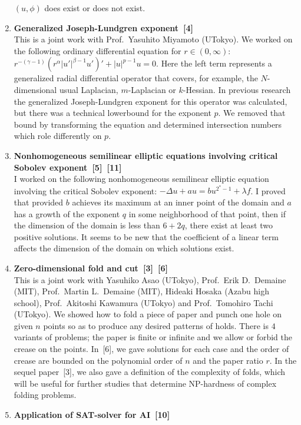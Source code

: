 \begin{enumerate}
  $(u, \phi)$ does exist or does not exist.
  \item {\bf Generalized Joseph-Lundgren exponent~[4]} \\
  This is a joint work with Prof.~Yasuhito Miyamoto (UTokyo).
  We worked on the following ordinary differential equation for $r
  \in (0, \infty)$:
  $r^{-(\gamma-1)} (r^\alpha \lvert u' \rvert^{\beta -1 } u')'
  + \lvert u \rvert^{p-1} u = 0$.
  Here the left term represents
  a generalized radial differential operator
  that covers, for example, the $N$-dimensional
  usual Laplacian, $m$-Laplacian or $k$-Hessian.
  In previous research
  the generalized Joseph-Lundgren exponent for this operator
  was calculated, but there was a technical lowerbound for
  the exponent $p$.
  We removed that bound by transforming the equation
  and determined intersection numbers
  which role differently on $p$.
  \item {\bf Nonhomogeneous semilinear elliptic equations involving
  critical Sobolev exponent~[5]~[11]} \\
  I worked on the following
  nonhomogeneous semilinear elliptic equation
  involving the critical Sobolev exponent:
  $-\Delta u + a u = b u^{2^* - 1} + \lambda f$.
  I proved that provided
  $b$ achieves its maximum at an inner point of the
  domain and $a$ has a growth of the exponent $q$
  in some neighborhood of that point, then
  if the dimension of the domain is less than $6 + 2q$,
  there exist at least two positive solutions.
  It seems to be new that the coefficient of a linear term affects
  the dimension of the domain on which solutions exist.
  \item {\bf Zero-dimensional fold and cut~[3]~[6]} \\
  This is a joint work with
  Yasuhiko Asao (UTokyo), Prof.~Erik D.~Demaine (MIT),
  Prof.~Martin L.~Demaine (MIT), Hideaki Hosaka (Azabu high school),
  Prof.~Akitoshi Kawamura (UTokyo)
  and Prof.~Tomohiro Tachi (UTokyo).
  We showed how to fold a piece of paper and punch one hole
  on given $n$ points
  so as to produce any desired patterns of holds.
  There is $4$ variants of problems;
  the paper is finite or infinite
  and we allow or forbid the crease on the points.
  In~[6], we gave solutions for each case and the order of crease
  are bounded on the polynomial order of $n$ and the paper ratio
  $r$.
  In the sequel paper~[3], we also gave a definition of
  the complexity of folds, which
  will be useful for further studies that determine
  NP-hardness of complex folding problems.
  \item {\bf Application of SAT-solver for AI~[10]} \\

\end{enumerate}

